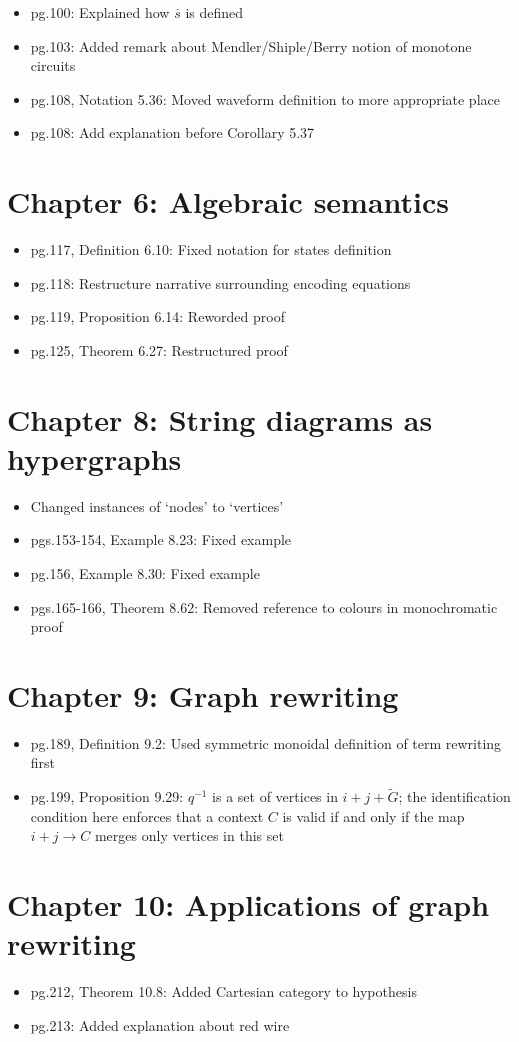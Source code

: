 \documentclass{article}
\begin{document}
\begin{itemize}
    \item pg.100: Explained how \(\overline{s}\) is defined
    \item pg.103: Added remark about Mendler/Shiple/Berry notion of monotone circuits
    \item pg.108, Notation 5.36: Moved waveform definition to more appropriate place
    \item pg.108: Add explanation before Corollary 5.37
\end{itemize}

\section*{Chapter 6: Algebraic semantics}

\begin{itemize}
    \item pg.117, Definition 6.10: Fixed notation for states definition
    \item pg.118: Restructure narrative surrounding encoding equations
    \item pg.119, Proposition 6.14: Reworded proof
    \item pg.125, Theorem 6.27: Restructured proof
\end{itemize}

\section*{Chapter 8: String diagrams as hypergraphs}

\begin{itemize}
    \item Changed instances of `nodes' to `vertices'
    \item pgs.153-154, Example 8.23: Fixed example
    \item pg.156, Example 8.30: Fixed example
    \item pgs.165-166, Theorem 8.62: Removed reference to colours in monochromatic proof
\end{itemize}

\section*{Chapter 9: Graph rewriting}

\begin{itemize}
    \item pg.189, Definition 9.2: Used symmetric monoidal definition of term rewriting first
    \item pg.199, Proposition 9.29: \(q^{-1}\) is a set of vertices in \(i+j+\tilde{G}\);
          the identification condition here enforces that a context \(C\) is valid
          if and only if the map \(i+j \to C\) merges only vertices in this set
\end{itemize}

\section*{Chapter 10: Applications of graph rewriting}

\begin{itemize}
    \item pg.212, Theorem 10.8: Added Cartesian category to hypothesis
    \item pg.213: Added explanation about red wire
\end{itemize}
\end{document}
